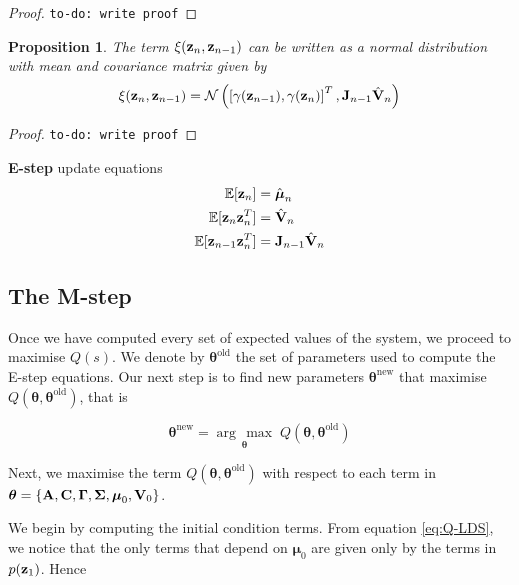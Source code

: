 \documentclass[11pt]{article}
\newcommand{\argmax}[1]{\underset{#1}{\operatorname{arg}\,\operatorname{max}}\;}
\newtheorem{proposition}{Proposition}[section]
\begin{document}
\begin{proof}
	\texttt{to-do: write proof}
\end{proof}

\begin{proposition}
	The term $\xi({\bf z}_n, {\bf z}_{n-1})$ can be written as a normal distribution with mean and covariance matrix given by
	\begin{equation}
		\xi({\bf z}_n, {\bf z}_{n-1}) = \mathcal{N}\left(\left[\gamma({\bf z}_{n-1}), \gamma({\bf z}_{n})\right]^T, {\bf J}_{n-1}\hat{\bf V}_{n}\right)
	\end{equation}
\end{proposition}

\begin{proof}
	\texttt{to-do: write proof}
\end{proof}

\begin{tcolorbox}
\textbf{E-step} update equations
\begin{align}
	\mathbb{E}[{\bf z}_n] &= \hat{\boldsymbol{\mu}}_n\\
	\mathbb{E}[{\bf z}_n {\bf z}_n^T] &= \hat{{\bf V}}_n\\
	\mathbb{E}[{\bf z}_{n-1}{\bf z}_n^T] &= {\bf J}_{n-1}\hat{\bf V}_n
\end{align}
\end{tcolorbox}


\subsection{The M-step}
Once we have computed every set of expected values of the system, we proceed to maximise $Q(s)$. We denote by $\boldsymbol{\theta}^\text{old}$ the set of parameters used to compute the E-step equations. Our next step is to find new parameters $\boldsymbol{\theta}^\text{new}$ that maximise $Q(\boldsymbol\theta, \boldsymbol\theta^\text{old})$, that is

\begin{equation}
	\boldsymbol{\theta}^\text{new} = \argmax{\boldsymbol\theta} Q(\boldsymbol\theta, \boldsymbol\theta^\text{old})
\end{equation}

Next, we maximise the term $Q(\boldsymbol\theta, \boldsymbol\theta^\text{old})$ with respect to each term in $\boldsymbol\theta = \{{\bf A}, {\bf C}, \boldsymbol\Gamma, \boldsymbol\Sigma, \boldsymbol\mu_0, {\bf V}_0\}$.

We begin by computing the initial condition terms. From equation \ref{eq:Q-LDS}, we notice that the only terms that depend on $\boldsymbol{\mu}_0$ are given only by the terms in $p({\bf z}_1)$. Hence
\end{document}
